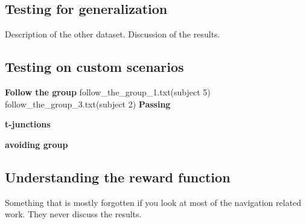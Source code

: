 \subsection*{Testing for generalization}
Description of the other dataset.
Discussion of the results.
\subsection*{Testing on custom scenarios}
\textbf{Follow the group}
follow\_the\_group\_1.txt(subject 5)
follow\_the\_group\_3.txt(subject 2)
\textbf{Passing}

\textbf{t-junctions}

\textbf{avoiding group}

\subsection*{Understanding the reward function}
Something that is mostly forgotten if you look at most of the navigation related work. They never discuss the results.
